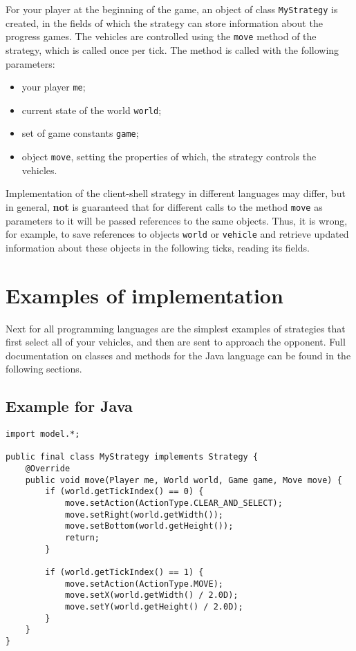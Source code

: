 For your player at the beginning of the game, an object of class \texttt{MyStrategy} is created, in the fields of which the strategy can store information about the progress
games. The vehicles are controlled using the \texttt{move} method of the strategy, which is called once per tick. The method is called
with the following parameters:
\begin{itemize}
  \item your player \texttt{me};
  \item current state of the world \texttt{world};
  \item set of game constants \texttt{game};
  \item object \texttt{move}, setting the properties of which, the strategy controls the vehicles.
\end{itemize}

 Implementation of the client-shell strategy in different languages may differ, but in general, \textbf{not} is guaranteed that for different
calls to the method \texttt {move} as parameters to it will be passed references to the same objects. Thus, it is wrong, for example,
to save references to objects \texttt{world} or \texttt{vehicle} and retrieve updated information about these objects in the following ticks, reading
its fields.

\newpage
\section{Examples of implementation}

Next for all programming languages are the simplest examples of strategies that first select all of your vehicles, and then are sent
to approach the opponent. Full documentation on classes and methods for the Java language can be found in the following sections.

\subsection{Example for Java}

\begin{verbatim}
import model.*;

public final class MyStrategy implements Strategy {
    @Override
    public void move(Player me, World world, Game game, Move move) {
        if (world.getTickIndex() == 0) {
            move.setAction(ActionType.CLEAR_AND_SELECT);
            move.setRight(world.getWidth());
            move.setBottom(world.getHeight());
            return;
        }

        if (world.getTickIndex() == 1) {
            move.setAction(ActionType.MOVE);
            move.setX(world.getWidth() / 2.0D);
            move.setY(world.getHeight() / 2.0D);
        }
    }
}
\end{verbatim}

